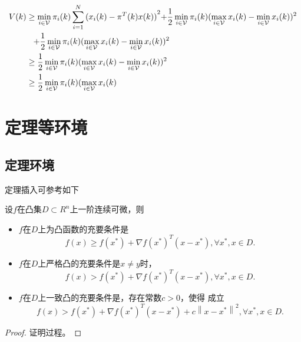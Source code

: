 \begin{equation}\label{system4}
  \begin{split}
V(k) &\ge \mathop {\min }\limits_{i \in {\cal V}} {\pi _i}(k)\sum\limits_{i = 1}^N {{{({x_i}(k) - {\pi ^T}(k)x(k))}^2}} {\rm{ + }}\frac{1}{2}\mathop {\min }\limits_{i \in {\cal V}} {\pi _i}(k){(\mathop {\max }\limits_{i \in {\cal V}} {x_i}(k) - \mathop {\min }\limits_{i \in {\cal V}} {x_i}(k))^2}\\
&\hspace{0.3cm}{\rm{ + }}\frac{1}{2}\mathop {\min }\limits_{i \in {\cal V}} {\pi _i}(k){(\mathop {\max }\limits_{i \in {\cal V}} {x_i}(k) - \mathop {\min }\limits_{i \in {\cal V}} {x_i}(k))^2}\\
& \ge \frac{1}{2}\mathop {\min }\limits_{i \in {\cal V}} {\pi _i}(k){(\mathop {\max }\limits_{i \in {\cal V}} {x_i}(k) - \mathop {\min }\limits_{i \in {\cal V}} {x_i}(k))^2}\\
 &\ge \frac{1}{2}\mathop {\min }\limits_{i \in {\cal V}} {\pi _i}(k)(\mathop {\max }\limits_{i \in {\cal V}} {x_i}(k)
  \end{split}
\end{equation}


\section{定理等环境}
\subsection{定理环境}

定理插入可参考如下
\begin{theorem}
设$f$在凸集$D \subset {R^n}$上一阶连续可微，则
\begin{itemize}
\item $f$在$D$上为凸函数的充要条件是
\begin{equation*}
f(x) \ge f({x^*}) + \nabla f{({x^*})^T}(x - {x^*}),\forall {x^*},x \in D.
\end{equation*}
\item  $f$在$D$上严格凸的充要条件是$x \ne y$时，
\begin{equation*}
f(x) > f({x^*}) + \nabla f{({x^*})^T}(x - {x^*}),\forall {x^*},x \in D.
\end{equation*}
\item $f$在$D$上一致凸的充要条件是，存在常数$c > 0$，使得
成立
\begin{equation*}
f(x) > f({x^*}) + \nabla f{({x^*})^T}(x - {x^*}) + c{\left\| {x - {x^*}} \right\|^2},\forall {x^*},x \in D.
\end{equation*}
\end{itemize}
\end{theorem}
\begin{proof}
  证明过程。
  \end{proof}

